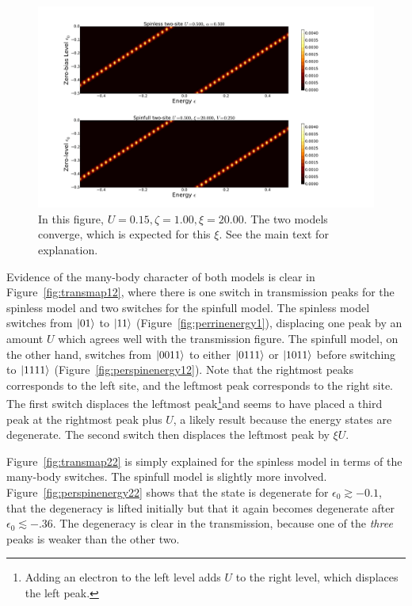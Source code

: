 \begin{figure}[h]
    \centering
    \includegraphics[height=.38\textheight]{pdf/map/transmap_u3_k4.pdf}
    \caption{In this figure, $U=0.15, \zeta=1.00, \xi=20.00$. The two models converge, which is expected for this $\xi$. See the main text for explanation.}
    \label{fig:transmap34}
\end{figure}

Evidence of the many-body character of both models is clear in Figure~\ref{fig:transmap12}, where there is one switch in transmission peaks for the spinless model and two switches for the spinfull model. The spinless model switches from $\ket{01}$ to $\ket{11}$ (Figure~\ref{fig:perrinenergy1}), displacing one peak by an amount $U$ which agrees well with the transmission figure.  The spinfull model, on the other hand, switches from $\ket{0011}$ to either $\ket{0111}$ or $\ket{1011}$ before switching to $\ket{1111}$ (Figure~\ref{fig:perspinenergy12}). Note that the rightmost peaks corresponds to the left site, and the leftmost peak corresponds to the right site. The first switch displaces the leftmost peak\footnote{Adding an electron to the left level adds $U$ to the right level, which displaces the left peak.}and seems to have placed a third peak at the rightmost peak plus $U$, a likely result because the energy states are degenerate. The second switch then displaces the leftmost peak by $\xi U$. 

Figure~\ref{fig:transmap22} is simply explained for the spinless model in terms of the many-body switches. The spinfull model is slightly more involved. Figure~\ref{fig:perspinenergy22} shows that the state is degenerate for $\epsilon_0 \gtrsim -0.1$, that the degeneracy is lifted initially but that it again becomes degenerate after $\epsilon_0 \lesssim -.36$. The degeneracy is clear in the transmission, because one of the \emph{three} peaks is weaker than the other two. 

